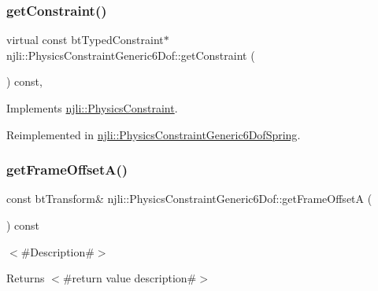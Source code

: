 \subsubsection{\texorpdfstring{get\+Constraint()}{getConstraint()}\hspace{0.1cm}{\footnotesize\ttfamily [2/2]}}
{\footnotesize\ttfamily virtual const bt\+Typed\+Constraint$\ast$ njli\+::\+Physics\+Constraint\+Generic6\+Dof\+::get\+Constraint (\begin{DoxyParamCaption}{ }\end{DoxyParamCaption}) const\hspace{0.3cm}{\ttfamily [protected]}, {\ttfamily [virtual]}}



Implements \mbox{\hyperlink{classnjli_1_1_physics_constraint_af4cb8c0158a044f75fe61f89cc278338}{njli\+::\+Physics\+Constraint}}.



Reimplemented in \mbox{\hyperlink{classnjli_1_1_physics_constraint_generic6_dof_spring_a072c17a336b74f574c9892e8ccf12278}{njli\+::\+Physics\+Constraint\+Generic6\+Dof\+Spring}}.

\mbox{\label{classnjli_1_1_physics_constraint_generic6_dof_a47e2abdae640363408d6b65abe8abeac}} 
\subsubsection{\texorpdfstring{get\+Frame\+Offset\+A()}{getFrameOffsetA()}\hspace{0.1cm}{\footnotesize\ttfamily [1/2]}}
{\footnotesize\ttfamily const bt\+Transform\& njli\+::\+Physics\+Constraint\+Generic6\+Dof\+::get\+Frame\+OffsetA (\begin{DoxyParamCaption}{ }\end{DoxyParamCaption}) const}

$<$\#\+Description\#$>$

\begin{DoxyReturn}{Returns}
$<$\#return value description\#$>$ 
\end{DoxyReturn}
\mbox{\label{classnjli_1_1_physics_constraint_generic6_dof_a5c522c9fc645e001c74d78d435fc31a9}} 
